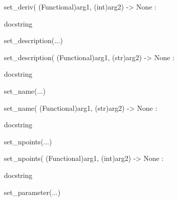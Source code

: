 \documentclass[letterpaper,10pt,english]{sphinxmanual}
\begin{document}
\begin{description}
\begin{description}
\begin{DUlineblock}{0em}
\begin{DUlineblock}{\DUlineblockindent}
\item[] set\_deriv( (Functional)arg1, (int)arg2) -\textgreater{} None :
\item[]
\begin{DUlineblock}{\DUlineblockindent}
\item[] docstring
\item[] 
\end{DUlineblock}
\end{DUlineblock}
\item[] set\_description(...)
\item[]
\begin{DUlineblock}{\DUlineblockindent}
\item[] set\_description( (Functional)arg1, (str)arg2) -\textgreater{} None :
\item[]
\begin{DUlineblock}{\DUlineblockindent}
\item[] docstring
\item[] 
\end{DUlineblock}
\end{DUlineblock}
\item[] set\_name(...)
\item[]
\begin{DUlineblock}{\DUlineblockindent}
\item[] set\_name( (Functional)arg1, (str)arg2) -\textgreater{} None :
\item[]
\begin{DUlineblock}{\DUlineblockindent}
\item[] docstring
\item[] 
\end{DUlineblock}
\end{DUlineblock}
\item[] set\_npoints(...)
\item[]
\begin{DUlineblock}{\DUlineblockindent}
\item[] set\_npoints( (Functional)arg1, (int)arg2) -\textgreater{} None :
\item[]
\begin{DUlineblock}{\DUlineblockindent}
\item[] docstring
\item[] 
\end{DUlineblock}
\end{DUlineblock}
\item[] set\_parameter(...)
\item[]
\begin{DUlineblock}{\DUlineblockindent}

\end{DUlineblock}
\end{DUlineblock}
\end{description}
\end{description}
\end{document}
